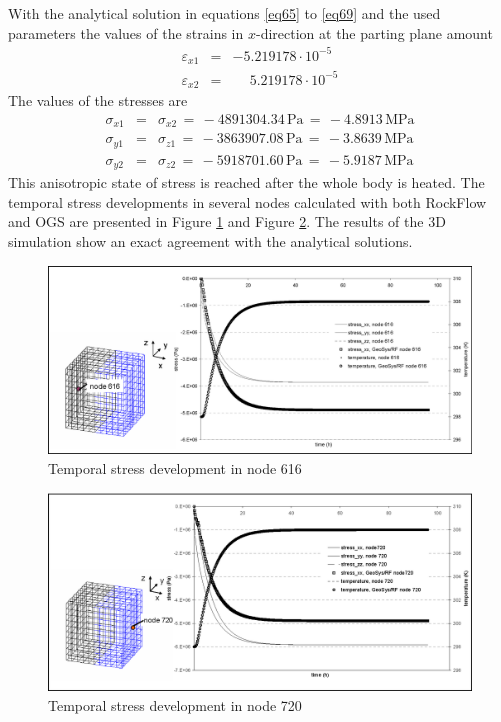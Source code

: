 With the analytical solution in equations \eqref{eq65} to \eqref{eq69} and the used parameters the values of the strains in $x$-direction at the parting plane amount
\begin{eqnarray*}
\varepsilon_{x1} & = & -5.219178\cdot 10^{-5} \\[1.5ex]
\varepsilon_{x2} & = & \phantom{-}5.219178\cdot 10^{-5}
\end{eqnarray*}
The values of the stresses are
\begin{eqnarray*}
\sigma_{x1} & = & \sigma_{x2}\,=\,-4891304.34\,\mathrm{Pa}
                             \,=\,-4.8913\,\mathrm{MPa} \\[1.5ex]
\sigma_{y1} & = & \sigma_{z1}\,=\,-3863907.08\,\mathrm{Pa}
                             \,=\,-3.8639\,\mathrm{MPa} \\[1.5ex]
\sigma_{y2} & = & \sigma_{z2}\,=\,-5918701.60\,\mathrm{Pa}
                             \,=\,-5.9187\,\mathrm{MPa}
\end{eqnarray*}
This anisotropic state of stress is reached after the whole body is heated. The temporal stress developments in several nodes calculated with both RockFlow and OGS are presented in Figure \ref{fig66} and Figure \ref{fig67}.
The results of the 3D simulation show an exact agreement with the analytical solutions.

\begin{figure}[!htbp]
\centering
\includegraphics[width=125mm]{PART_III/TM/figures/fig66}
\caption{Temporal stress development in node 616}
\label{fig66}
\end{figure}

\begin{figure}[!htbp]
\centering
\includegraphics[width=125mm]{PART_III/TM/figures/fig67}
\caption{Temporal stress development in node 720}
\label{fig67}
\end{figure}


